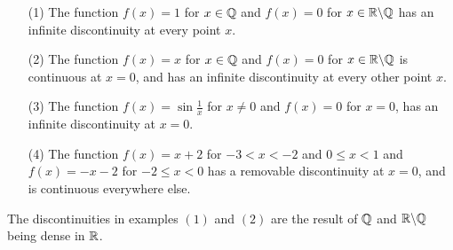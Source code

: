\begin{example}
    \begin{enumerate}
        \item[(1)] The function $f(x)=1$ for  $x \in \mathbb{Q}$ and  $f(x)=0$ for  $x \in \mathbb{R} \backslash \mathbb{Q}$ has
            an infinite discontinuity at every point $x$.

        \item[(2)] The function $f(x)=x$ for  $x \in \mathbb{Q}$ and  $f(x)=0$ for
            $x \in \mathbb{R} \backslash \mathbb{Q}$ is continuous at $x=0$, and has an infinite
            discontinuity at every other point $x$.

        \item[(3)] The function $f(x)=\sin{\frac{1}{x}}$ for  $x \neq 0$ and  $f(x)=0$ for $x=0$,
            has an infinite discontinuity at $x=0$.

        \item[(4)] The function $f(x)=x+2$ for  $-3<x<-2$ and  $0 \leq x<1$ and  $f(x)=-x-2$ for
            $-2 \leq x<0$ has a removable discontinuity at  $x=0$, and is continuous everywhere
            else.
    \end{enumerate}
\end{example}

\begin{remark}
    The discontinuities in examples $(1)$ and  $(2)$ are the result of  $\mathbb{Q}$ and
    $\mathbb{R} \backslash \mathbb{Q}$ being dense in  $\mathbb{R}$.
\end{remark}
